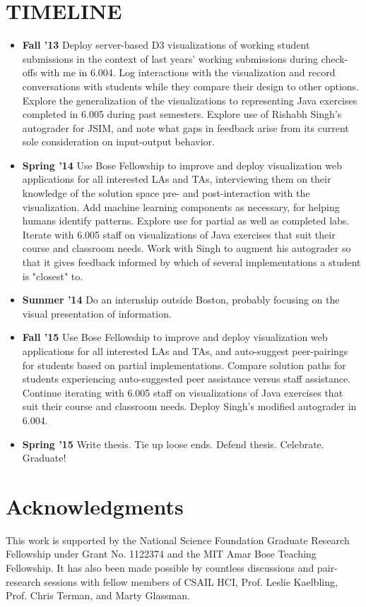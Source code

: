 \documentclass[12pt]{article}
\begin{document}
\section{TIMELINE}

\begin{itemize}
\item {\bf Fall '13} Deploy server-based D3 visualizations of working student submissions in the context of last years' working submissions during check-offs with me in 6.004. Log interactions with the visualization and record conversations with students while they compare their design to other options. Explore the generalization of the visualizations to representing Java exercises completed in 6.005 during past semesters. Explore use of Rishabh Singh's autograder for JSIM, and note what gaps in feedback arise from its current sole consideration on input-output behavior.
\item {\bf Spring '14} Use Bose Fellowship to improve and deploy visualization web applications for all interested LAs and TAs, interviewing them on their knowledge of the solution space pre- and post-interaction with the visualization. Add machine learning components as necessary, for helping humans identify patterns. Explore use for partial as well as completed labs. Iterate with 6.005 staff on visualizations of Java exercises that suit their course and classroom needs. Work with Singh to augment his autograder so that it gives feedback informed by which of several implementations a student is "closest" to.
\item {\bf Summer '14} Do an internship outside Boston, probably focusing on the visual presentation of information.
\item {\bf Fall '15} Use Bose Fellowship to improve and deploy visualization web applications for all interested LAs and TAs, and auto-suggest peer-pairings for students based on partial implementations. Compare solution paths for students experiencing auto-suggested peer assistance versus staff assistance. Continue iterating with 6.005 staff on visualizations of Java exercises that suit their course and classroom needs. Deploy Singh's modified autograder in 6.004.
\item {\bf Spring '15} Write thesis. Tie up loose ends. Defend thesis. Celebrate. Graduate!
\end{itemize}

\section{Acknowledgments}
This work is supported by the National Science Foundation Graduate Research Fellowship under Grant No. 1122374 and the MIT Amar Bose Teaching Fellowship. It has also been made possible by countless discussions and pair-research sessions with fellow members of CSAIL HCI, Prof. Leslie Kaelbling, Prof. Chris Terman, and Marty Glassman.
\end{document}
